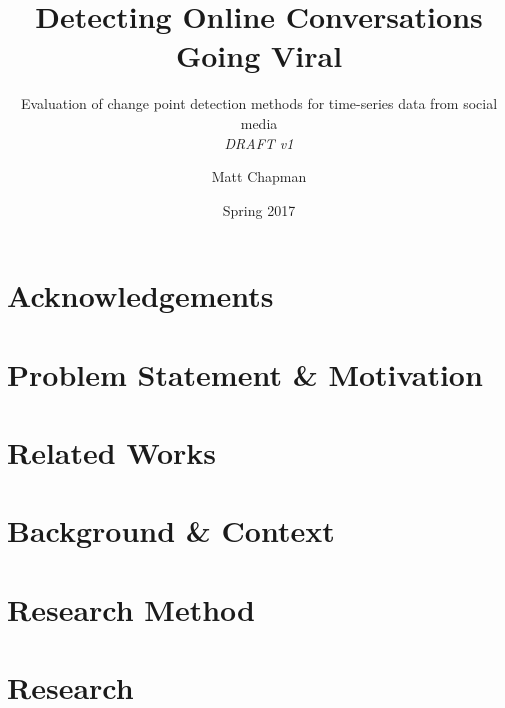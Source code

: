 \documentclass{uvamscse}	%
\title{Detecting Online Conversations Going Viral}
\subtitle{Evaluation of change point detection methods for time-series data from social media\\
\emph{DRAFT v1}}
\date{Spring 2017}
\author{Matt Chapman}
\begin{document}
\maketitle


\chapter*{Acknowledgements}




\chapter{Problem Statement \& Motivation}




\chapter{Related Works}




\chapter{Background \& Context}




\chapter{Research Method}
\label{Research Method}




\chapter{Research}
\end{document}
